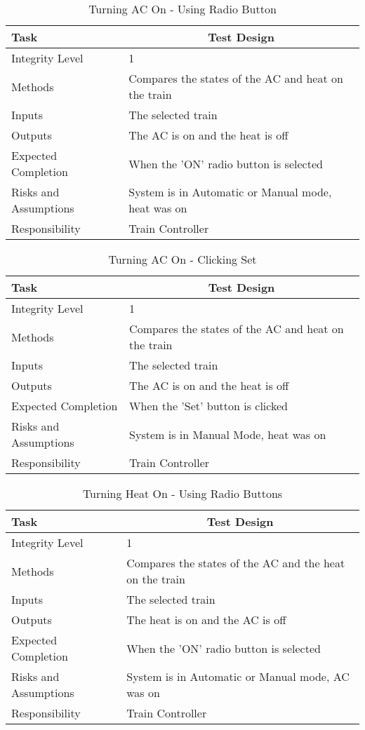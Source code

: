 \documentclass[]{article}
\begin{document}
\begin{table}[H]
	\centering
	\caption{Turning AC On - Using Radio Button}
	\begin{tabular}{|l|l|}
		\hline
		Task & \multicolumn{1}{c|}{Test Design} \\ \hline
		Integrity Level & 1 \\ \hline
		Methods & Compares the states of the AC and heat on the train\\ \hline
		Inputs & The selected train\\ \hline
		Outputs & The AC is on and the heat is off \\ \hline
		Expected Completion & When the 'ON' radio button is selected\\ \hline
		Risks and Assumptions & System is in Automatic or Manual mode, heat was on \\ \hline
		Responsibility & Train Controller\\ \hline
	\end{tabular}
\end{table}

\begin{table}[H]
	\centering
	\caption{Turning AC On - Clicking Set}
	\begin{tabular}{|l|l|}
		\hline
		Task & \multicolumn{1}{c|}{Test Design} \\ \hline
		Integrity Level & 1 \\ \hline
		Methods & Compares the states of the AC and heat on the train\\ \hline
		Inputs & The selected train\\ \hline
		Outputs & The AC is on and the heat is off \\ \hline
		Expected Completion & When the 'Set' button is clicked\\ \hline
		Risks and Assumptions & System is in Manual Mode, heat was on \\ \hline
		Responsibility &  Train Controller\\ \hline
	\end{tabular}
\end{table}

\begin{table}[H]
	\centering
	\caption{Turning Heat On - Using Radio Buttons}
	\begin{tabular}{|l|l|}
		\hline
		Task & \multicolumn{1}{c|}{Test Design} \\ \hline
		Integrity Level & 1 \\ \hline
		Methods & Compares the states of the AC and the heat on the train\\ \hline
		Inputs & The selected train\\ \hline
		Outputs & The heat is on and the AC is off\\ \hline
		Expected Completion & When the 'ON' radio button is selected\\ \hline
		Risks and Assumptions & System is in Automatic or Manual mode, AC was on \\ \hline
		Responsibility &  Train Controller\\ \hline
	\end{tabular}
\end{table}
\end{document}
